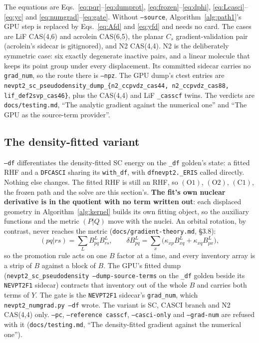 \documentclass[11pt]{article}
\newcommand{\code}[1]{\texttt{#1}}
\newcommand{\cons}[1]{\ensuremath{(\mathrm{#1})}}
\begin{document}
The equations are Eqs.~\eqref{eq:pqr}--\eqref{eq:dumprot},
\eqref{eq:frozen}--\eqref{eq:dphi}, \eqref{eq:Lcasci}--\eqref{eq:yc} and
\eqref{eq:numgrad}--\eqref{eq:gate}. Without \code{--source}, Algorithm~\ref{alg:path1}'s
GPU step is replaced by Eqs.~\eqref{eq:Afd} and \eqref{eq:yfd} and needs no
card. The cases are LiF CAS(4,6) and acrolein CAS(6,5), the planar $C_s$
gradient-validation pair (acrolein's sidecar is gitignored), and N2 CAS(4,4).
N2 is the deliberately symmetric case: six exactly degenerate inactive pairs,
and a linear molecule that keeps its point group under every displacement. Its
committed sidecar carries no \code{grad\_num}, so the route there is
\code{--npz}. The GPU dump's ctest entries are
\code{nevpt2\_sc\_pseudodensity\_dump\_\{n2\_ccpvdz\_cas44,
n2\_ccpvdz\_cas88, lif\_def2svp\_cas46\}}, plus the CAS(4,4) and LiF
\code{\_casscf} twins.
The verdicts are \code{docs/testing.md}, ``The analytic gradient against the
numerical one'' and ``The GPU as the source-term provider''.

\subsection{The density-fitted variant}
\label{sec:df}

\code{--df} differentiates the density-fitted SC energy on the \code{\_df}
golden's state: a fitted RHF and a \code{DFCASCI} sharing its \code{with\_df},
with \code{dfnevpt2.\_ERIS} called directly. Nothing else changes. The fitted
RHF is still an RHF, so \cons{O1}, \cons{O2}, \cons{C1}, the frozen path and
the solve are this section's. \textbf{The fit's own nuclear derivative is in the
quotient with no term written out}: each displaced geometry in
Algorithm~\ref{alg:kernel} builds its own fitting object, so the auxiliary
functions and the metric $(P|Q)$ move with the nuclei. An orbital rotation, by
contrast, never reaches the metric (\code{docs/gradient-theory.md}, \S3.8):
\begin{equation}
  (pq|rs) = \sum_L B^L_{pq}B^L_{rs},\qquad
  \delta B^L_{pq} = \sum_x \bigl(\kappa_{xp}B^L_{xq} + \kappa_{xq}B^L_{px}\bigr),
  \label{eq:dB}
\end{equation}
so the promotion rule acts on one $B$ factor at a time, and every inventory
array is a strip of $B$ against a block of $B$. The GPU's fitted dump
(\code{nevpt2\_sc\_pseudodensity --dump-source-terms} on the \code{\_df}
golden beside its \code{NEVPT2F1} sidecar) contracts that inventory out of the
whole $B$ and carries both terms of $Y$. The gate is the \code{NEVPT2F1}
sidecar's \code{grad\_num}, which \code{nevpt2\_numgrad.py --df} wrote. The
variant is SC, CASCI branch and N2 CAS(4,4) only. \code{--pc},
\code{--reference casscf}, \code{--casci-only} and \code{--grad-num} are
refused with it (\code{docs/testing.md}, ``The density-fitted gradient against
the numerical one'').
\end{document}

